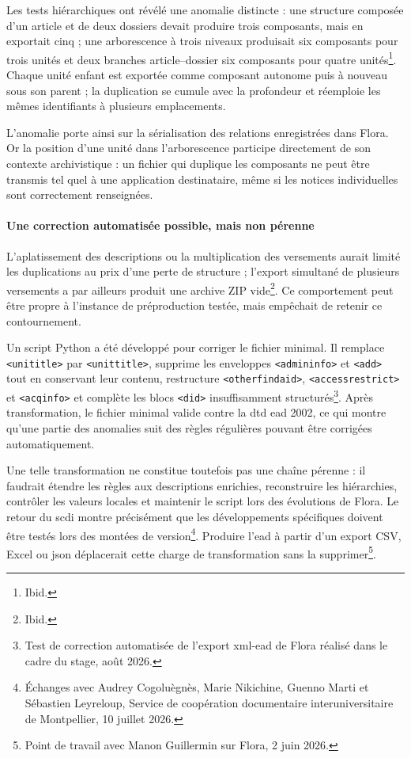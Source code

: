 Les tests hiérarchiques ont révélé une anomalie distincte : une structure composée d'un article et de deux dossiers devait produire trois composants, mais en exportait cinq ; une arborescence à trois niveaux produisait six composants pour trois unités et deux branches article--dossier six composants pour quatre unités\footnote{Ibid.}. Chaque unité enfant est exportée comme composant autonome puis à nouveau sous son parent ; la duplication se cumule avec la profondeur et réemploie les mêmes identifiants à plusieurs emplacements.

L'anomalie porte ainsi sur la sérialisation des relations enregistrées dans Flora. Or la position d'une unité dans l'arborescence participe directement de son contexte archivistique : un fichier qui duplique les composants ne peut être transmis tel quel à une application destinataire, même si les notices individuelles sont correctement renseignées.

\paragraph{Une correction automatisée possible, mais non pérenne}

L'aplatissement des descriptions ou la multiplication des versements aurait limité les duplications au prix d'une perte de structure ; l'export simultané de plusieurs versements a par ailleurs produit une archive ZIP vide\footnote{Ibid.}. Ce comportement peut être propre à l'instance de préproduction testée, mais empêchait de retenir ce contournement.

Un script Python a été développé pour corriger le fichier minimal. Il remplace \texttt{<unititle>} par \texttt{<unittitle>}, supprime les enveloppes \texttt{<admininfo>} et \texttt{<add>} tout en conservant leur contenu, restructure \texttt{<otherfindaid>}, \texttt{<accessrestrict>} et \texttt{<acqinfo>} et complète les blocs \texttt{<did>} insuffisamment structurés\footnote{Test de correction automatisée de l'export \gls{xml}-\gls{ead} de Flora réalisé dans le cadre du stage, août 2026.}. Après transformation, le fichier minimal valide contre la \gls{dtd} \gls{ead} 2002, ce qui montre qu'une partie des anomalies suit des règles régulières pouvant être corrigées automatiquement.

Une telle transformation ne constitue toutefois pas une chaîne pérenne : il faudrait étendre les règles aux descriptions enrichies, reconstruire les hiérarchies, contrôler les valeurs locales et maintenir le script lors des évolutions de Flora. Le retour du \gls{scdi} montre précisément que les développements spécifiques doivent être testés lors des montées de version\footnote{Échanges avec Audrey Cogoluègnès, Marie Nikichine, Guenno Marti et Sébastien Leyreloup, Service de coopération documentaire interuniversitaire de Montpellier, 10 juillet 2026.}. Produire l'\gls{ead} à partir d'un export CSV, Excel ou \gls{json} déplacerait cette charge de transformation sans la supprimer\footnote{Point de travail avec Manon Guillermin sur Flora, 2 juin 2026.}.

